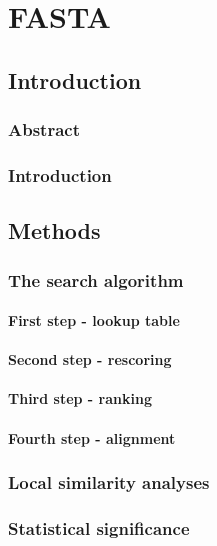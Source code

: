 \chapter{FASTA}

\section{Introduction}

	\subsection{Abstract}

	\subsection{Introduction}

\section{Methods}

	\subsection{The search algorithm}

		\subsubsection{First step - lookup table}

		\subsubsection{Second step - rescoring}

		\subsubsection{Third step - ranking}

		\subsubsection{Fourth step - alignment}

	\subsection{Local similarity analyses}

	\subsection{Statistical significance}

